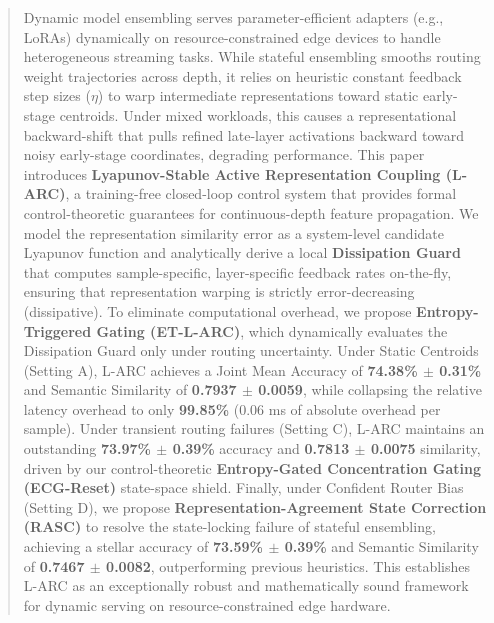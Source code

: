 \begin{abstract}
Dynamic model ensembling serves parameter-efficient adapters (e.g., LoRAs)
dynamically on resource-constrained edge devices to handle heterogeneous
streaming tasks. While stateful ensembling smooths routing weight trajectories
across depth, it relies on heuristic constant feedback step sizes ($\eta$)
to warp intermediate representations toward static early-stage centroids. Under
mixed workloads, this causes a representational backward-shift that pulls
refined late-layer activations backward toward noisy early-stage coordinates,
degrading performance. This paper introduces \textbf{Lyapunov-Stable Active
Representation Coupling (L-ARC)}, a training-free closed-loop control system
that provides formal control-theoretic guarantees for continuous-depth feature
propagation. We model the representation similarity error as a system-level
candidate Lyapunov function and analytically derive a local \textbf{Dissipation
Guard} that computes sample-specific, layer-specific feedback rates on-the-fly,
ensuring that representation warping is strictly error-decreasing (dissipative).
To eliminate computational overhead, we propose \textbf{Entropy-Triggered
Gating (ET-L-ARC)}, which dynamically evaluates the Dissipation Guard only under
routing uncertainty. Under Static Centroids (Setting A), L-ARC achieves a Joint
Mean Accuracy of \textbf{74.38\% $\pm$ 0.31\%} and Semantic Similarity of
\textbf{0.7937 $\pm$ 0.0059}, while collapsing the relative latency overhead to
only \textbf{99.85\%} ($0.06$ ms of absolute overhead per sample). Under
transient routing failures (Setting C), L-ARC maintains an outstanding
\textbf{73.97\% $\pm$ 0.39\%} accuracy and \textbf{0.7813 $\pm$ 0.0075} similarity,
driven by our control-theoretic \textbf{Entropy-Gated Concentration Gating
(ECG-Reset)} state-space shield. Finally, under Confident Router Bias (Setting D),
we propose \textbf{Representation-Agreement State Correction (RASC)} to resolve
the state-locking failure of stateful ensembling, achieving a stellar accuracy of
\textbf{73.59\% $\pm$ 0.39\%} and Semantic Similarity of \textbf{0.7467 $\pm$
0.0082}, outperforming previous heuristics. This establishes L-ARC as an
exceptionally robust and mathematically sound framework for dynamic serving on
resource-constrained edge hardware.
\end{abstract}
